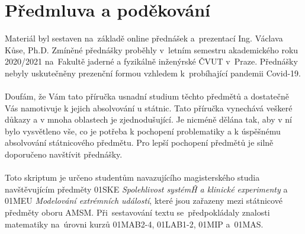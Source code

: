 \chapter*{Předmluva a poděkování}

Materiál byl sestaven na~základě online přednášek a~prezentací Ing. Václava Kůse, Ph.D. Zmíněné přednášky proběhly v~letním semestru akademického roku 2020/2021 na~Fakultě jaderné a fyzikálně inženýrské ČVUT v~Praze. Přednášky nebyly uskutečněny prezenční formou vzhledem k~probíhající pandemii Covid-19.
\\ \\
Doufám, že Vám tato příručka usnadní studium těchto předmětů a dostatečně Vás namotivuje k jejich absolvování u státnic. Tato příručka vynechává veškeré důkazy a v mnoha oblastech je zjednodušující. Je nicméně dělána tak, aby v ní bylo vysvětleno vše, co je potřeba k pochopení problematiky a k úspěšnému absolvování státnicového předmětu. Pro lepší pochopení předmětů je silně doporučeno navštívit přednášky.
\\ \\
Toto skriptum je určeno studentům navazujícího magisterského studia navštěvujícím předměty 01SKE\emph{ Spolehlivost systémĤ a klinické experimenty} a 01MEU\emph{ Modelování extrémních událostí}, které jsou zařazeny mezi státnicové předměty oboru AMSM. Při~sestavování textu se~předpokládaly znalosti matematiky na~úrovni kurzů 01MAB2-4, 01LAB1-2, 01MIP a~01MAS.
